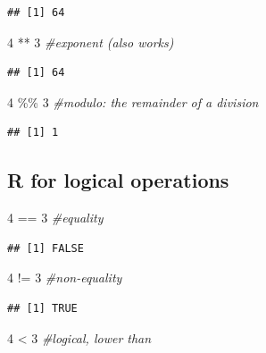 \documentclass[
]{article}
\newenvironment{Shaded}{\begin{snugshade}}{\end{snugshade}}
\newcommand{\CommentTok}[1]{\textcolor[rgb]{0.56,0.35,0.01}{\textit{#1}}}
\newcommand{\DecValTok}[1]{\textcolor[rgb]{0.00,0.00,0.81}{#1}}
\newcommand{\SpecialCharTok}[1]{\textcolor[rgb]{0.00,0.00,0.00}{#1}}
\begin{document}
\begin{verbatim}
## [1] 64
\end{verbatim}

\begin{Shaded}
\begin{Highlighting}[]
\DecValTok{4} \SpecialCharTok{**} \DecValTok{3} \CommentTok{\#exponent (also works)}
\end{Highlighting}
\end{Shaded}

\begin{verbatim}
## [1] 64
\end{verbatim}

\begin{Shaded}
\begin{Highlighting}[]
\DecValTok{4} \SpecialCharTok{\%\%} \DecValTok{3} \CommentTok{\#modulo: the remainder of a division}
\end{Highlighting}
\end{Shaded}

\begin{verbatim}
## [1] 1
\end{verbatim}

\hypertarget{r-for-logical-operations}{%
\subsection{R for logical operations}\label{r-for-logical-operations}}

\begin{Shaded}
\begin{Highlighting}[]
\DecValTok{4} \SpecialCharTok{==} \DecValTok{3} \CommentTok{\#equality}
\end{Highlighting}
\end{Shaded}

\begin{verbatim}
## [1] FALSE
\end{verbatim}

\begin{Shaded}
\begin{Highlighting}[]
\DecValTok{4} \SpecialCharTok{!=} \DecValTok{3} \CommentTok{\#non{-}equality}
\end{Highlighting}
\end{Shaded}

\begin{verbatim}
## [1] TRUE
\end{verbatim}

\begin{Shaded}
\begin{Highlighting}[]
\DecValTok{4} \SpecialCharTok{\textless{}} \DecValTok{3} \CommentTok{\#logical, lower than}
\end{Highlighting}
\end{Shaded}
\end{document}
